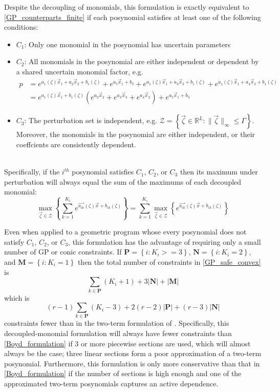 Despite the decoupling of monomials, this formulation is exactly equivalent to \eqref{GP_counterparts_finite} if each posynomial satisfies at least one of the following conditions:
\begin{itemize}
	\item $C_1$: Only one monomial in the posynomial has uncertain parameters
	\item $C_2$: All monomials in the posynomial are either independent or dependent by a shared uncertain monomial factor, e.g. $$
	\begin{aligned}
	p &= e^{a_1\left(\zeta\right)\vec{x}_1 + a_2\vec{x}_2 + b_1\left(\zeta\right)} + e^{a_5\vec{x}_1 + b_3} + e^{a_1\left(\zeta\right)\vec{x}_1 + a_3\vec{x}_3 + b_1\left(\zeta\right)} + e^{a_1\left(\zeta\right)\vec{x}_1 + a_4\vec{x}_2 + b_1\left(\zeta\right)}\\
	&= e^{a_1\left(\zeta\right)\vec{x}_1 + b_1\left(\zeta\right)}\left(e^{a_2\vec{x}_2} + e^{a_3\vec{x}_3} + e^{a_4\vec{x}_2}\right) + e^{a_5\vec{x}_1 + b_3}
	\end{aligned}
	$$
	\item $C_3$: The perturbation set is independent, e.g. $\mathcal{Z} = \left\{ \vec{\zeta} \in \mathbb{R}^L: \|\vec{\zeta}\|_{\infty} \leq \Gamma\right\}$. Moreover, the monomials in the posynomial are either independent, or their coeffcients are consistently dependent.
\end{itemize}
\ \\
Specifically, if the $i^{th}$ posynomial satisfies $C_1$, $C_2$, or $C_3$ then its maximum under perturbation will always equal the sum of the maximums of each decoupled monomial:
$$
\max_{\vec{\zeta} \in \mathcal{Z}} \left\{\textstyle{\sum}_{k=1}^{K_i}e^{\vec{a_{ik}}\left(\zeta\right)\vec{x} + b_{ik}\left(\zeta\right)}\right\} = \sum_{k=1}^{K_i}\max_{\vec{\zeta} \in \mathcal{Z}} \left\{e^{\vec{a_{ik}}\left(\zeta\right)\vec{x} + b_{ik}\left(\zeta\right)}\right\}
$$

Even when applied to a geometric program whose every posynomial does not satisfy $C_1$, $C_2$, or $C_3$, this formulation has the advantage of requiring only a small number of GP or conic constraints. If $\mathbf{P} = \left\{i:K_i >=3\right\}$, $\mathbf{N} = \left\{i:K_i = 2\right\}$, and $\mathbf{M} = \left\{i:K_i = 1\right\}$ then the total number of constraints in \eqref{GP_safe_convex} is 
$$\textstyle{\sum}_{k \in \mathbf{P}} (K_i+1) + 3|\mathbf{N}| + |\mathbf{M}|$$
which is 
$$(r-1)\textstyle{\sum}_{k \in \mathbf{P}} (K_i-3) + 2(r-2)|\mathbf{P}| + (r-3)|\mathbf{N}|$$
constraints fewer than in the two-term formulation of \cite{hsiung_kim_boyd_2007}.
Specifically, this decoupled-monomial formulation will always have fewer constraints than \eqref{Boyd_formulation} if 3 or more piecewise sections are used, which will almost always be the case; three linear sections form a poor approximation of a two-term posynomial. Furthermore, this formulation is only more conservative than that in \eqref{Boyd_formulation} if the number of sections is high enough and one of the approximated two-term posynomials captures an active dependence.